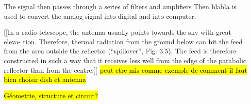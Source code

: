 The signal then passes through a series of filters and amplifiers
Then blabla is used to convert the analog signal into digital and into computer.

[[In a radio telescope, the antenna usually points towards the sky with great eleva-
tion. Therefore, thermal radiation from the ground below can hit the feed from the
area outside the reflector (“spillover”, Fig. 3.5). The feed is therefore constructed
in such a way that it receives less well from the edge of the parabolic reflector than
from the centre.]] \hl{peut etre mis comme exemple de comment il faut bien choisir dish et antenna}


\hl{Géometrie, structure et circuit?}
\cite{installation_manual_2022}
\cite{interdisciplinary_project_2022}

